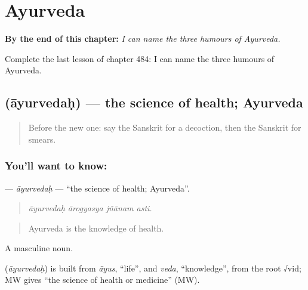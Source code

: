 
\chapter{Ayurveda}
\label{ch:sa-ayurveda}

\begin{chapteropening}
\textbf{By the end of this chapter:} \emph{I can name the three humours of Ayurveda.}

Complete the last lesson of chapter 484: I can name the three humours of Ayurveda.
\end{chapteropening}

\section[\texorpdfstring{\sk{आयुर्वेदः} (āyurvedaḥ)}{आयुर्वेदः (āyurvedaḥ)}]{ (āyurvedaḥ) — the science of health; Ayurveda}

\label{lesson:SA-C484-ayurvedah}



\begin{quote}
Before the new one: say the Sanskrit for a decoction, then the Sanskrit for smears.
\end{quote}

\subsection*{You'll want to know: }
\textbf{} — \emph{āyurvedaḥ} — \textquotedblleft{}the science of health; Ayurveda\textquotedblright{}.

\begin{quote}
   
\end{quote}

\begin{quote}
\emph{āyurvedaḥ ārogyasya jñānam asti.}
\end{quote}

\begin{quote}
Ayurveda is the knowledge of health.
\end{quote}

A masculine noun.

\begin{cousinweb}
\textbf{} (\emph{āyurvedaḥ}) is built from \emph{āyus}, \textquotedblleft{}life\textquotedblright{}, and \emph{veda}, \textquotedblleft{}knowledge\textquotedblright{}, from the root √vid; MW gives \textquotedblleft{}the science of health or medicine\textquotedblright{} (MW).
\end{cousinweb}

